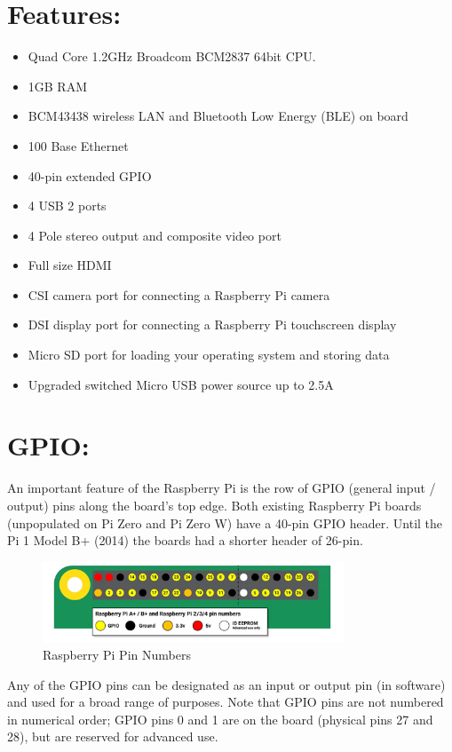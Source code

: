 \section*{Features: }
\begin{itemize}
\item Quad Core 1.2GHz Broadcom BCM2837 64bit CPU.
\item 1GB RAM
\item BCM43438 wireless LAN and Bluetooth Low Energy (BLE) on board
\item 100 Base Ethernet
\item 40-pin extended GPIO
\item 4 USB 2 ports
\item 4 Pole stereo output and composite video port
\item Full size HDMI
\item CSI camera port for connecting a Raspberry Pi camera
\item DSI display port for connecting a Raspberry Pi touchscreen display
\item Micro SD port for loading your operating system and storing data
\item Upgraded switched Micro USB power source up to 2.5A
\end{itemize}

\section*{GPIO: }
An important feature of the Raspberry Pi is the row of GPIO (general input / output) pins along the board's top edge. Both existing Raspberry Pi boards (unpopulated on Pi Zero and Pi Zero W) have a 40-pin GPIO header. Until the Pi 1 Model B+ (2014) the boards had a shorter header of 26-pin.

\begin{figure}[ht]
    \centering
    \includegraphics[width=0.8\textwidth]{figures/Raspberry Pi Pin Numbers.png}
    \caption{Raspberry Pi Pin Numbers}
\end{figure}

Any of the GPIO pins can be designated as an input or output pin (in software) and used for a broad range of purposes. Note that GPIO pins are not numbered in numerical order; GPIO pins 0 and 1 are on the board (physical pins 27 and 28), but are reserved for advanced use.

